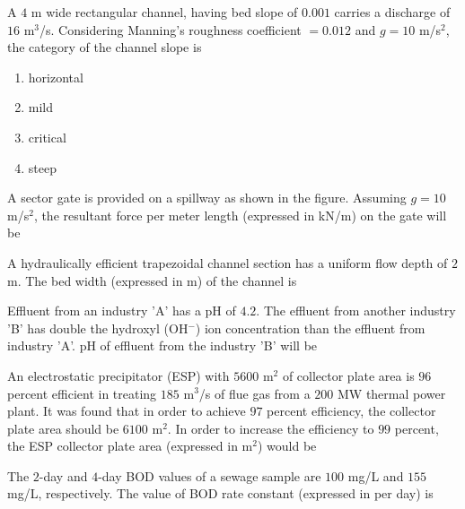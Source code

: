     \item A $4$ m wide rectangular channel, having bed slope of $0.001$ carries a discharge of $16$ m$^3$/s. Considering Manning's roughness coefficient $=0.012$ and $g=10$ m/s$^2$, the category of the channel slope is
    \begin{enumerate}
        \item horizontal
        \item mild
        \item critical
        \item steep
    \end{enumerate}

    \item A sector gate is provided on a spillway as shown in the figure. Assuming $g=10$ m/s$^2$, the resultant force per meter length (expressed in kN/m) on the gate will be \underline{\hspace{2cm}}
    \begin{figure}[h!]
        \centering
        
    \end{figure}

    \item A hydraulically efficient trapezoidal channel section has a uniform flow depth of $2$ m. The bed width (expressed in m) of the channel is \underline{\hspace{2cm}}

    \item Effluent from an industry 'A' has a pH of $4.2$. The effluent from another industry 'B' has double the hydroxyl (OH$^-$) ion concentration than the effluent from industry 'A'. pH of effluent from the industry 'B' will be \underline{\hspace{2cm}}

    \item An electrostatic precipitator (ESP) with $5600$ m$^2$ of collector plate area is $96$ percent efficient in treating $185$ m$^3$/s of flue gas from a $200$ MW thermal power plant. It was found that in order to achieve $97$ percent efficiency, the collector plate area should be $6100$ m$^2$. In order to increase the efficiency to $99$ percent, the ESP collector plate area (expressed in m$^2$) would be \underline{\hspace{2cm}}

    \item The $2$-day and $4$-day BOD values of a sewage sample are $100$ mg/L and $155$ mg/L, respectively. The value of BOD rate constant (expressed in per day) is \underline{\hspace{2cm}}

